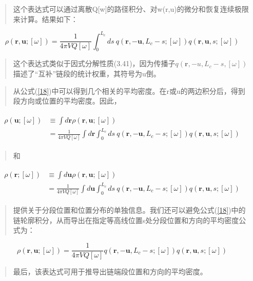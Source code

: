 \begin{quotation}
这个表达式可以通过离散Q[w]的路径积分、对w(r,u)的微分和恢复连续极限来计算。结果如下：
\end{quotation}
\begin{equation}\label{18}
\rho(\mathbf{r},\mathbf{u};[\omega])=\frac{1}{4\pi VQ[\omega]}\int_{0}^{L_c}ds~ q(\mathbf{r},-\mathbf{u},L_c-s;[\omega])q(\mathbf{r},\mathbf{u},s;[\omega])
\end{equation}
\begin{quotation}
这个表达式类似于因式分解性质(3.41)，因为传播子$q(\mathbf{r},-u,L_c-s,[\omega])$描述了“互补”链段的统计权重，其符号为u倒。
\end{quotation}
\begin{quotation}
从公式(\ref{18})中可以得到几个相关的平均密度。在r或u的两边积分后，得到段方向或位置的平均密度。因此，
\end{quotation}
\begin{align}\label{19}
\begin{split}
\rho(\mathbf{u};[\omega])&\equiv\int d\mathbf{r} \rho(\mathbf{r},\mathbf{u};[\omega]) \\&=\frac{1}{4\pi VQ[\omega]}\int d\mathbf{r} \int_{0}^{L_c}ds~q(\mathbf{r},-\mathbf{u},L_c-s;[\omega])q(\mathbf{r},\mathbf{u},s;[\omega])
\end{split}
\end{align}
\begin{quotation}
和
\end{quotation}
\begin{align}\label{20}
\begin{split}
\rho(\mathbf{r};[\omega])&\equiv\int d\mathbf{u} \rho(\mathbf{r},\mathbf{u};[\omega]) \\&=\frac{1}{4\pi VQ[\omega]}\int d\mathbf{u} \int_{0}^{L_c}ds~q(\mathbf{r},-\mathbf{u},L_c-s;[\omega])q(\mathbf{r},\mathbf{u},s;[\omega])
\end{split}
\end{align}
\begin{quotation}
提供关于分段位置和位置分布的单独信息。我们还可以避免公式(\ref{18})中的链轮廓积分，从而导出在指定等高线位置s处分段位置和方向的平均密度公式为：
\end{quotation}
\begin{equation}\label{21}
\rho(\mathbf{r},\mathbf{u};[\omega])=\frac{1}{4\pi VQ[\omega]}q(\mathbf{r},-\mathbf{u},L_c-s;[\omega])q(\mathbf{r},\mathbf{u},s;[\omega])
\end{equation}
\begin{quotation}
最后，该表达式可用于推导出链端段位置和方向的平均密度。
\end{quotation}
